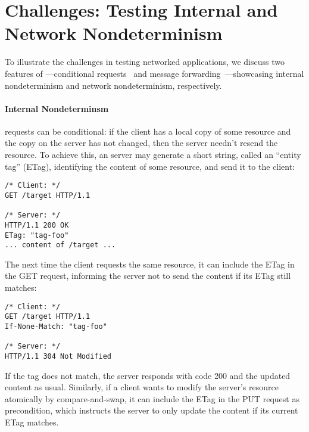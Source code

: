 \section{Challenges: Testing Internal and Network Nondeterminism}
\label{sec:challenge}
To illustrate the challenges in testing networked applications, we discuss two
features of \http---conditional requests~\cite{rfc7232}
and message forwarding~\cite{rfc7231}---showcasing internal nondeterminism
and network nondeterminism, respectively.

\paragraph*{Internal Nondeterminsm}
\http requests can be conditional: if the client has a local copy of some
resource and the copy on the server has not changed, then the server needn't
resend the resource.  To
achieve this, an \http server may generate a short string, called an ``entity tag'' (ETag), identifying the
content of some resource, and send it to
the client: %
\begin{lstlisting}[style=customc]
/* Client: */
GET /target HTTP/1.1

/* Server: */
HTTP/1.1 200 OK
ETag: "tag-foo"
... content of /target ...
\end{lstlisting}
The next time the client requests the same resource, it can include the ETag in
the GET request, informing the server not to send the content if its ETag
still matches:

\begin{lstlisting}[style=customc]
/* Client: */
GET /target HTTP/1.1
If-None-Match: "tag-foo"

/* Server: */
HTTP/1.1 304 Not Modified
\end{lstlisting}
If the tag does not
match, the server responds with code 200 and the updated content as usual.
%
Similarly, if a client wants to modify the server's resource atomically by
compare-and-swap, it can include the ETag in the PUT request as  precondition, which
instructs the server to only update the content if its current ETag matches.
%


